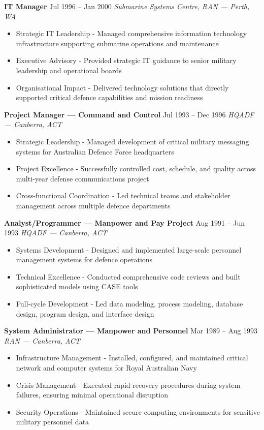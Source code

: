 \documentclass[11pt,a4paper]{article}
\begin{document}
\textbf{IT Manager} \hfill Jul 1996 – Jan 2000
\textit{Submarine Systems Centre, RAN — Perth, WA}
\begin{itemize}
\item Strategic IT Leadership - Managed comprehensive information technology infrastructure supporting submarine operations and maintenance
\item Executive Advisory - Provided strategic IT guidance to senior military leadership and operational boards
\item Organisational Impact - Delivered technology solutions that directly supported critical defence capabilities and mission readiness
\end{itemize}

\textbf{Project Manager — Command and Control} \hfill Jul 1993 – Dec 1996
\textit{HQADF — Canberra, ACT}
\begin{itemize}
\item Strategic Leadership - Managed development of critical military messaging systems for Australian Defence Force headquarters
\item Project Excellence - Successfully controlled cost, schedule, and quality across multi-year defense communications project
\item Cross-functional Coordination - Led technical teams and stakeholder management across multiple defence departments
\end{itemize}

\textbf{Analyst/Programmer — Manpower and Pay Project} \hfill Aug 1991 – Jun 1993
\textit{HQADF — Canberra, ACT}
\begin{itemize}
\item Systems Development - Designed and implemented large-scale personnel management systems for defence operations
\item Technical Excellence - Conducted comprehensive code reviews and built sophisticated models using CASE tools
\item Full-cycle Development - Led data modeling, process modeling, database design, program design, and interface design
\end{itemize}

\textbf{System Administrator — Manpower and Personnel} \hfill Mar 1989 – Aug 1993
\textit{RAN — Canberra, ACT}
\begin{itemize}
\item Infrastructure Management - Installed, configured, and maintained critical network and computer systems for Royal Australian Navy
\item Crisis Management - Executed rapid recovery procedures during system failures, ensuring minimal operational disruption
\item Security Operations - Maintained secure computing environments for sensitive military personnel data
\end{itemize}
\end{document}
